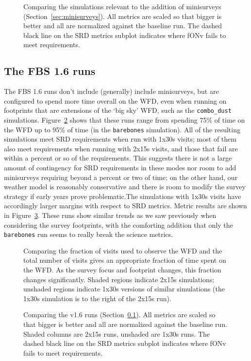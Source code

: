 \begin{figure}
\caption{Comparing the simulations relevant to the addition of minisurveys (Section~\ref{sec:minisurveys}). All metrics are scaled so that bigger is better and all are normalized against the baseline run. The dashed black line on the SRD metrics subplot indicates where fONv fails to meet requirements.}
\label{fig:minisurveys}
\end{figure}

\subsection{The FBS 1.6 runs}\label{sec:runsv16}

The FBS 1.6 runs don't include (generally) include minisurveys, but are configured to spend more time overall on the WFD, even when running on footprints that are extensions of the `big sky' WFD, such as the {\tt combo\_dust} simulations. Figure~\ref{fig:v16_wfdfraction} shows that these runs range from spending 75\% of time on the WFD up to 95\% of time (in the {\tt barebones} simulation). All of the resulting simulations meet SRD requirements when run with 1x30s visits; most of them also meet requirements when running with 2x15s visits, and those that fail are within a percent or so of the requirements. This suggests there is not a large amount of contingency for SRD requirements in these modes nor room to add minisurveys requiring beyond a percent or two of time; on the other hand, our weather model is reasonably conservative and there is room to modify the survey strategy if early years prove problematic.The simulations with 1x30s visits have accordingly larger margins with respect to SRD metrics. Metric results are shown in Figure~\ref{fig:v16}. These runs show similar trends as we saw previously when considering the survey footprints, with the comforting addition that only the {\tt barebones} run seems to really break the science metrics.

\begin{figure}
\caption{Comparing the fraction of visits used to observe the WFD and the total number of visits gives an appropriate fraction of time spent on the WFD. As the survey focus and footprint changes, this fraction changes significantly. Shaded regions indicate 2x15s simulations; unshaded regions indicate 1x30s versions of similar simulations (the 1x30s simulation is to the right of the 2x15s run).}
\label{fig:v16_wfdfraction}
\end{figure}

\begin{figure}
\caption{Comparing the v1.6 runs (Section~\ref{sec:runsv16}). All metrics are scaled so that bigger is better and all are normalized against the baseline run. Shaded columns are 2x15s runs, unshaded are 1x30s runs. The dashed black line on the SRD metrics subplot indicates where fONv fails to meet requirements.}
\label{fig:v16}
\end{figure}

